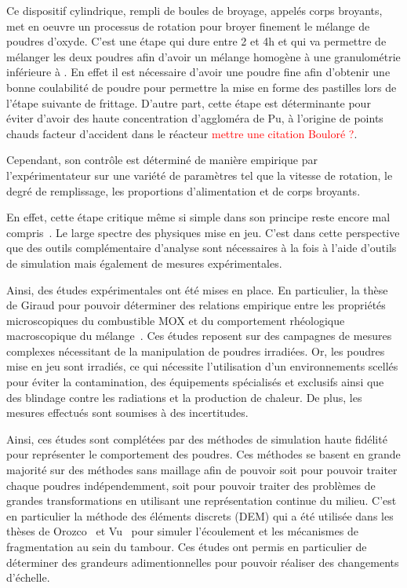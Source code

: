 Ce dispositif cylindrique, rempli de boules de broyage, appelés corps broyants, met en oeuvre un processus de rotation pour broyer finement le mélange de poudres d'oxyde. C'est une étape qui dure entre 2 et 4h et qui va permettre de mélanger les deux poudres afin d'avoir un mélange homogène à une granulométrie inférieure à . En effet il est nécessaire d'avoir une poudre fine afin d'obtenir une bonne coulabilité de poudre pour permettre la mise en forme des pastilles lors de l'étape suivante de frittage. D'autre part, cette étape est déterminante pour éviter d'avoir des haute concentration d'aggloméra de Pu, à l'origine de points chauds facteur d'accident dans le réacteur \textcolor{red}{mettre une citation Bouloré ?}.

Cependant, son contrôle est déterminé de manière empirique par l'expérimentateur sur une variété de paramètres tel que la vitesse de rotation, le degré de remplissage, les proportions d'alimentation et de corps broyants.

En effet, cette étape critique même si simple dans son principe reste encore mal compris~\cite{Austin1981,Brandao2020,Mankosa1986,Datta2002,Capece2014}.
Le large spectre des physiques mise en jeu.
C'est dans cette perspective que des outils complémentaire d'analyse sont nécessaires à la fois à l'aide d'outils de simulation mais également de mesures expérimentales.

Ainsi, des études expérimentales ont été mises en place. En particulier, la thèse de Giraud pour pouvoir déterminer des relations empirique entre les propriétés microscopiques du combustible MOX et du comportement rhéologique macroscopique du mélange~\cite{giraud_analyse_2020}. Ces études reposent sur des campagnes de mesures complexes nécessitant de la manipulation de poudres irradiées. Or, les poudres mise en jeu sont irradiés, ce qui nécessite l'utilisation d'un environnements scellés pour éviter la contamination, des équipements spécialisés et exclusifs ainsi que des blindage contre les radiations et la production de chaleur. De plus, les mesures effectués sont soumises à des incertitudes.

Ainsi, ces études sont complétées par des méthodes de simulation haute fidélité pour représenter le comportement des poudres. Ces méthodes se basent en grande majorité sur des méthodes sans maillage afin de pouvoir soit pour pouvoir traiter chaque poudres indépendemment, soit pour pouvoir traiter des problèmes de grandes transformations en utilisant une représentation continue du milieu. C'est en particulier la méthode des éléments discrets (DEM) qui a été utilisée dans les thèses de Orozco~\cite{Orozco2019} et Vu~\cite{vu_quasi-static_2023} pour simuler l'écoulement et les mécanismes de fragmentation au sein du tambour. Ces études ont permis en particulier de déterminer des grandeurs adimentionnelles pour pouvoir réaliser des changements d'échelle.

